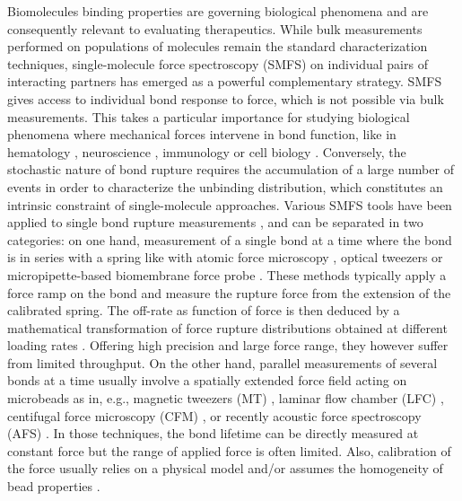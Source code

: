 \documentclass{biophys-new}
\begin{document}
Biomolecules binding properties are governing biological phenomena and are consequently relevant to evaluating therapeutics. While bulk measurements performed on populations of molecules remain the standard characterization techniques, single-molecule force spectroscopy (SMFS) on individual pairs of interacting partners has emerged as a powerful complementary strategy. SMFS gives access to individual bond response to force, which is not possible via bulk measurements. This takes a particular importance for studying biological phenomena where mechanical forces intervene in bond function, like in hematology \cite{kim2010}, neuroscience \cite{gao2012}, immunology \cite{huse2017} or cell biology \cite{rognoni2012}. Conversely, the stochastic nature of bond rupture requires the accumulation of a large number of events in order to characterize the unbinding distribution, which constitutes an intrinsic constraint of single-molecule approaches. Various SMFS tools have been applied to single bond rupture measurements \cite{limozin2019}, and can be separated in two categories: on one hand, measurement of a single bond at a time where the bond is in series with a spring like with atomic force microscopy \cite{schwesinger2000, rico2019}, optical tweezers \cite{kulin2002, gao2012} or micropipette-based biomembrane force probe \cite{merkel1999}. These methods typically apply a force ramp on the bond and measure the rupture force from the extension of the calibrated spring. The off-rate as function of force is then deduced by a mathematical transformation of force rupture distributions obtained at different loading rates \cite{dudko2008}. Offering high precision and large force range, they however suffer from limited throughput. On the other hand, parallel measurements of several bonds at a time usually involve a spatially extended force field acting on microbeads as in, e.g., magnetic tweezers (MT) \cite{shang2007}, laminar flow chamber (LFC) \cite{robert2008, gonzalez2019}, centifugal force microscopy (CFM) \cite{halvorsen2010, yang2016}, or recently acoustic force spectroscopy (AFS) \cite{sitters2015, kamsma2016}. In those techniques, the bond lifetime can be directly measured at constant force but the range of applied force is often limited. Also, calibration of the force usually relies on a physical model and/or assumes the homogeneity of bead properties \cite{gosse2002}.
\end{document}

